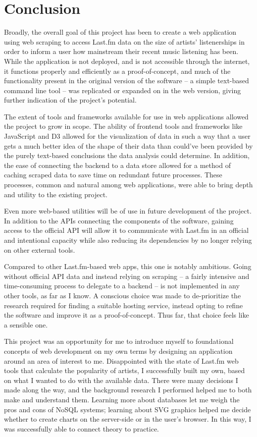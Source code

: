 \chapter{Conclusion}\label{conclusion}

Broadly, the overall goal of this project has been to create a web application using web scraping to access Last.fm data on the size of artists' listenerships in order to inform a user how mainstream their recent music listening has been. While the application is not deployed, and is not accessible through the internet, it functions properly and efficiently as a proof-of-concept, and much of the functionality present in the original version of the software -- a simple text-based command line tool -- was replicated or expanded on in the web version, giving further indication of the project's potential.

The extent of tools and frameworks available for use in web applications allowed the project to grow in scope. The ability of frontend tools and frameworks like JavaScript and D3 allowed for the visualization of data in such a way that a user gets a much better idea of the shape of their data than could've been provided by the purely text-based conclusions the data analysis could determine. In addition, the ease of connecting the backend to a data store allowed for a method of caching scraped data to save time on redundant future processes. These processes, common and natural among web applications, were able to bring depth and utility to the existing project.

Even more web-based utilities will be of use in future development of the project. In addition to the APIs connecting the components of the software, gaining access to the official API will allow it to communicate with Last.fm in an official and intentional capacity while also reducing its dependencies by no longer relying on other external tools.

Compared to other Last.fm-based web apps, this one is notably ambitious. Going without official API data and instead relying on scraping -- a fairly intensive and time-consuming process to delegate to a backend -- is not implemented in any other tools, as far as I know. A conscious choice was made to de-prioritize the research required for finding a suitable hosting service, instead opting to refine the software and improve it as a proof-of-concept. Thus far, that choice feels like a sensible one.

This project was an opportunity for me to introduce myself to foundational concepts of web development on my own terms by designing an application around an area of interest to me. Disappointed with the state of Last.fm web tools that calculate the popularity of artists, I successfully built my own, based on what I wanted to do with the available data. There were many decisions I made along the way, and the background research I performed helped me to both make and understand them. Learning more about databases let me weigh the pros and cons of NoSQL systems; learning about SVG graphics helped me decide whether to create charts on the server-side or in the user's browser. In this way, I was successfully able to connect theory to practice.

